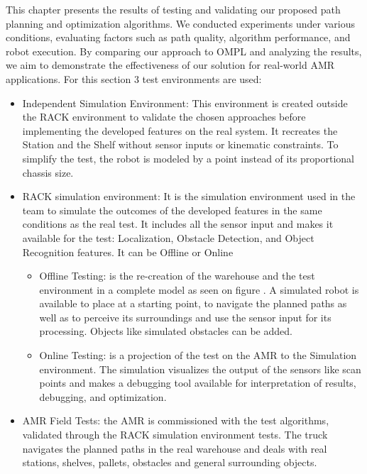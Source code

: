 This chapter presents the results of testing and validating our proposed path planning and optimization algorithms. 
We conducted experiments under various conditions, evaluating factors such as path quality, algorithm 
performance, and robot execution. By comparing our approach to OMPL and analyzing the results, we aim 
to demonstrate the effectiveness of our solution for real-world AMR applications.
For this section 3 test environments are used:
\begin{itemize}
    \item Independent Simulation Environment: This environment is created outside the RACK 
    environment to validate the chosen approaches before implementing the developed features 
    on the real system. It recreates the Station and the Shelf without sensor inputs or kinematic constraints.
    To simplify the test, the robot is modeled by a point instead of its proportional chassis size.

    \item RACK simulation environment: It is the simulation environment used in the team to simulate 
    the outcomes of the developed features in the same conditions as the real test. It includes all the sensor 
    input and makes it available for the test: Localization, Obstacle Detection, and Object Recognition features.
    It can be Offline or Online
    \begin{itemize}
        \item Offline Testing: is the re-creation of the warehouse and the test environment in a complete model
        as seen on figure . A simulated robot is available to place at a starting point, 
        to navigate the planned paths as well
        as to perceive its surroundings and use the sensor input for its processing. Objects like simulated 
        obstacles can be added. 
        \item Online Testing: is a projection of the test on the AMR to the Simulation environment.
        The simulation visualizes the output of the sensors like scan points and makes a debugging 
        tool available for interpretation of results, debugging, and optimization.
    \end{itemize}

    \item AMR Field Tests: the AMR is commissioned with the test algorithms, validated through the RACK simulation
    environment tests. The truck navigates the planned paths in the real warehouse and deals with real stations, 
    shelves, pallets, obstacles and general surrounding objects.
\end{itemize}

